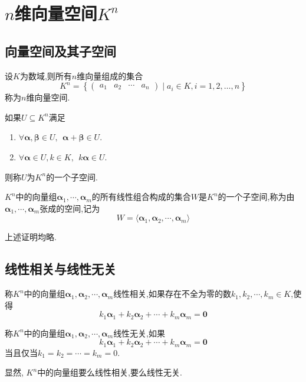 \documentclass{ctexart}
\begin{document}
\section{$n$维向量空间$K^n$}
\subsection{向量空间及其子空间}
\begin{definition}[$n$维向量空间]
    设$K$为数域,则所有$n$维向量组成的集合
    \[K^n=\left\{\begin{pmatrix}
        a_1&a_2&\cdots&a_n
    \end{pmatrix}\mid a_i\in K, i=1,2,\ldots,n\right\}\]
    称为$n$维向量空间.
\end{definition}
\begin{definition}[子空间]
    如果$U\subseteq K^n$满足
    \begin{enumerate}[label=\tbf{\arabic*}.,topsep=0pt,parsep=0pt,itemsep=0pt,partopsep=0pt]
        \item $\forall\boldsymbol{\alpha},\boldsymbol{\beta}\in U,\ \ \boldsymbol{\alpha}+\boldsymbol{\beta}\in U$.
        \item $\forall\boldsymbol{\alpha}\in U,k\in K,\ \ k\boldsymbol{\alpha}\in U$.
    \end{enumerate}
    则称$U$为$K^n$的一个子空间.
\end{definition}
\begin{definition}[张成空间]
    $K^n$中的向量组$\boldsymbol{\alpha}_1,\cdots,\boldsymbol{\alpha}_m$的所有线性组合构成的集合$W$是$K^n$的一个子空间,称为由$\boldsymbol{\alpha}_1,\cdots,\boldsymbol{\alpha}_m$张成的空间,记为
    \[W=\langle\boldsymbol{\alpha}_1,\boldsymbol{\alpha}_2,\cdots,\boldsymbol{\alpha}_m\rangle\]
\end{definition}
上述证明均略.
\subsection{线性相关与线性无关}
\begin{definition}[线性相关]
    称$K^n$中的向量组$\boldsymbol{\alpha}_1,\boldsymbol{\alpha}_2,\cdots,\boldsymbol{\alpha}_m$线性相关,如果存在不全为零的数$k_1,k_2,\cdots,k_m\in K$,使得
    \[k_1\boldsymbol{\alpha}_1+k_2\boldsymbol{\alpha}_2+\cdots+k_m\boldsymbol{\alpha}_m=\boldsymbol{0}\]
\end{definition}
\begin{definition}[线性无关]
    称$K^n$中的向量组$\boldsymbol{\alpha}_1,\boldsymbol{\alpha}_2,\cdots,\boldsymbol{\alpha}_m$线性无关,如果
    \[k_1\boldsymbol{\alpha}_1+k_2\boldsymbol{\alpha}_2+\cdots+k_m\boldsymbol{\alpha}_m=\boldsymbol{0}\]
    当且仅当$k_1=k_2=\cdots=k_m=0$.
\end{definition}
显然, $K^n$中的向量组要么线性相关,要么线性无关.
\end{document}

